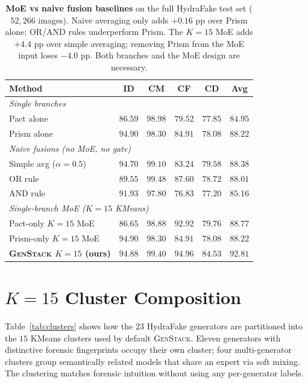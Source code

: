 \documentclass[10pt,twocolumn,letterpaper]{article}
\begin{document}
\begin{table}[t]
\centering
\footnotesize
\setlength{\tabcolsep}{4pt}
\caption{\textbf{MoE vs naive fusion baselines} on the full HydraFake test set ($52{,}266$ images). Naive averaging only adds $+0.16$ pp over Prism alone; OR/AND rules underperform Prism. The $K{=}15$ MoE adds $+4.4$ pp over simple averaging; removing Prism from the MoE input loses $-4.0$ pp. Both branches and the MoE design are necessary.}
\label{tab:naive}
\begin{tabular}{l c c c c c}
\toprule
Method & ID & CM & CF & CD & Avg \\
\midrule
\multicolumn{6}{l}{\emph{Single branches}} \\
Pact alone               & $86.59$ & $98.98$ & $79.52$ & $77.85$ & $84.95$ \\
Prism alone              & $94.90$ & $98.30$ & $84.91$ & $78.08$ & $88.22$ \\
\midrule
\multicolumn{6}{l}{\emph{Naive fusions (no MoE, no gate)}} \\
Simple avg ($\alpha{=}0.5$)& $94.70$ & $99.10$ & $83.24$ & $79.58$ & $88.38$ \\
OR rule                  & $89.55$ & $99.48$ & $87.60$ & $78.72$ & $88.01$ \\
AND rule                 & $91.93$ & $97.80$ & $76.83$ & $77.20$ & $85.16$ \\
\midrule
\multicolumn{6}{l}{\emph{Single-branch MoE ($K{=}15$ KMeans)}} \\
Pact-only $K{=}15$ MoE       & $86.65$ & $98.88$ & $92.92$ & $79.76$ & $88.77$ \\
Prism-only $K{=}15$ MoE      & $94.90$ & $98.30$ & $84.91$ & $78.08$ & $88.22$ \\
\midrule
\textbf{\textsc{GenStack} $K{=}15$ (ours)} & $\mathbf{94.88}$ & $\mathbf{99.40}$ & $\mathbf{94.96}$ & $\mathbf{84.53}$ & $\mathbf{92.81}$ \\
\bottomrule
\end{tabular}
\end{table}

\section{$K{=}15$ Cluster Composition}
\label{sec:clusters}

Table~\ref{tab:clusters} shows how the $23$ HydraFake generators are partitioned into the $15$ KMeans clusters used by default \textsc{GenStack}. Eleven generators with distinctive forensic fingerprints occupy their own cluster; four multi-generator clusters group semantically related models that share an expert via soft mixing. The clustering matches forensic intuition without using any per-generator labels.
\end{document}
